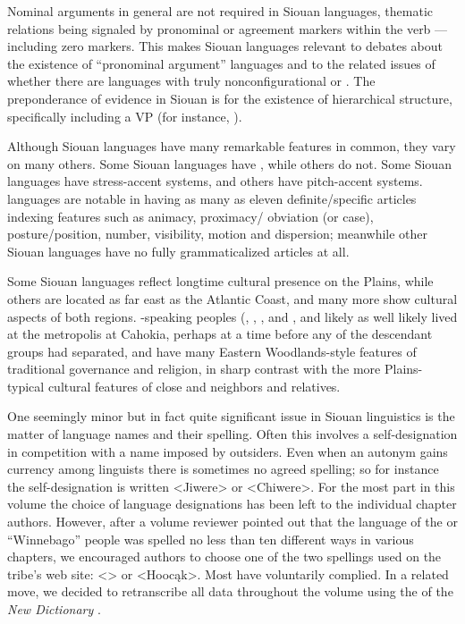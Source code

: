 \begin{refsection}
Nominal arguments in general are not required in Siouan languages, thematic relations being signaled by pronominal or agreement markers within the verb --- including zero markers. This makes Siouan languages relevant to debates about the existence of ``pronominal argument'' languages \citep{Jelinek1984} and to the related issues of whether there are languages with truly nonconfigurational or . The preponderance of evidence in Siouan is for the existence of hierarchical structure, specifically including a VP (for instance, \citealt{West2003,Johnson2016, JohnsonEtAl2016, Rosen2016}).


Although Siouan languages have many remarkable features in common, they vary on many others.  Some Siouan languages have , while others do not. Some Siouan languages have stress-accent systems, and others have pitch-accent systems.  languages are notable in having as many as eleven definite/specific articles indexing features such as animacy, proximacy/ obviation (or case), posture/position, number, visibility, motion and dispersion; meanwhile other Siouan languages have no fully grammaticalized articles at all.


Some Siouan languages reflect longtime cultural presence on the Plains, while others are located as far east as the Atlantic Coast, and many more show cultural aspects of both regions. -speaking peoples (, , ,  and , and likely  as well \citep{Kasak2016,Koontz1995a} likely lived at the metropolis at Cahokia, perhaps at a time before any of the descendant groups had separated, and have many Eastern Woodlands-style features of traditional governance and religion, in sharp contrast with the more Plains-typical cultural features of close  and  neighbors and relatives.

One seemingly minor but in fact quite significant issue in Siouan linguistics is the matter of language names and their spelling. Often this involves a self-designation in competition with a name imposed by outsiders. Even when an autonym gains currency among linguists there is sometimes no agreed spelling; so for instance the  self-designation is written <Jiwere> or <Chiwere>. For the most part in this volume the choice of language designations has been left to the individual chapter authors. However, after a volume reviewer pointed out that the language of the  or ``Winnebago'' people was spelled no less than ten different ways in various chapters, we encouraged authors to choose one of the two spellings used on the tribe's web site:  <> or <Hooc\k{a}k>.  Most have voluntarily complied.  In a related move, we decided to retranscribe all  data throughout the volume using the  of the \textit{New  Dictionary} \citep{Ullrich2012}.


\end{refsection}
